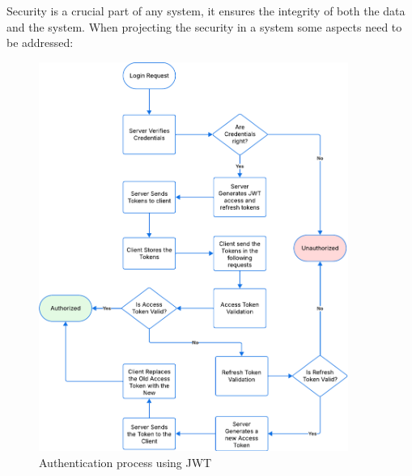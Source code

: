 Security is a crucial part of any system, it ensures the integrity of both
the data and the system. When projecting the security in a system some
aspects need to be addressed:

\begin{figure}[htbp]
	\centering
	\includegraphics[width=0.9\textwidth, height=0.6\textheight, keepaspectratio]{Chapters/Figures/Security/JWT.pdf}
	\caption{Authentication process using \gls{JWT}}
	\label{fig:security:JWT}
\end{figure}

